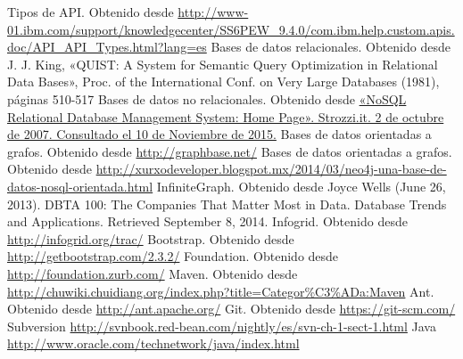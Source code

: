 \begin{thebibliography}{99}
   Tipos de API. Obtenido desde \url{http://www-01.ibm.com/support/knowledgecenter/SS6PEW_9.4.0/com.ibm.help.custom.apis.doc/API_API_Types.html?lang=es}
   Bases de datos relacionales. Obtenido desde J. J. King, «QUIST: A System for Semantic Query Optimization in Relational Data Bases», Proc. of the International Conf. on Very Large Databases (1981),
páginas 510-517
   Bases de datos no relacionales. Obtenido desde \url{ «NoSQL Relational Database Management System: Home Page». Strozzi.it. 2 de octubre de 2007. Consultado el 10 de Noviembre de 2015.}
   Bases de datos orientadas a grafos. Obtenido desde \url{ http://graphbase.net/}
   Bases de datos orientadas a grafos. Obtenido desde \url{ http://xurxodeveloper.blogspot.mx/2014/03/neo4j-una-base-de-datos-nosql-orientada.html}
   InfiniteGraph. Obtenido desde  Joyce Wells (June 26, 2013). DBTA 100: The Companies That Matter Most in Data. Database Trends and Applications. Retrieved September 8, 2014.
   Infogrid. Obtenido desde  \url{http://infogrid.org/trac/}
   Bootstrap. Obtenido desde  \url{http://getbootstrap.com/2.3.2/}
   Foundation. Obtenido desde  \url{http://foundation.zurb.com/}
   Maven. Obtenido desde  \url{http://chuwiki.chuidiang.org/index.php?title=Categor%C3%ADa:Maven}
   Ant. Obtenido desde  \url{http://ant.apache.org/}
   Git. Obtenido desde  \url{https://git-scm.com/}
   Subversion \url{http://svnbook.red-bean.com/nightly/es/svn-ch-1-sect-1.html}
   Java \url{http://www.oracle.com/technetwork/java/index.html}
   
  
   

\end{thebibliography}


